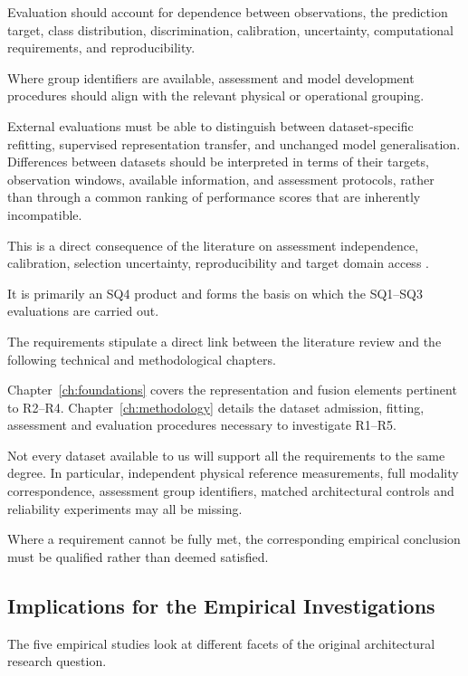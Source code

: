 Evaluation should account for dependence between observations, the prediction target, class
distribution, discrimination, calibration, uncertainty, computational requirements, and
reproducibility.

Where group identifiers are available, assessment and model development procedures should align with
the relevant physical or operational grouping.

External evaluations must be able to distinguish between dataset-specific refitting, supervised
representation transfer, and unchanged model generalisation. Differences between datasets should be
interpreted in terms of their targets, observation windows, available information, and assessment
protocols, rather than through a common ranking of performance scores that are inherently
incompatible.

This is a direct consequence of the literature on assessment independence, calibration, selection
uncertainty, reproducibility and target domain access
\citep{P004,P017,Guo2017Calibration,P008,Bengio2004CVVariance,P009}.

It is primarily an SQ4 product and forms the basis on which the SQ1--SQ3 evaluations are carried
out.

The requirements stipulate a direct link between the literature review and the following technical
and methodological chapters.

Chapter~\ref{ch:foundations} covers the representation and fusion elements pertinent to R2--R4.
Chapter~\ref{ch:methodology} details the dataset admission, fitting, assessment and evaluation
procedures necessary to investigate R1--R5.

Not every dataset available to us will support all the requirements to the same degree. In
particular, independent physical reference measurements, full modality correspondence, assessment
group identifiers, matched architectural controls and reliability experiments may all be missing.

Where a requirement cannot be fully met, the corresponding empirical conclusion must be qualified
rather than deemed satisfied.

\subsection{Implications for the Empirical Investigations}

\label{sec:literature-study-gaps}

The five empirical studies look at different facets of the original architectural research question.

